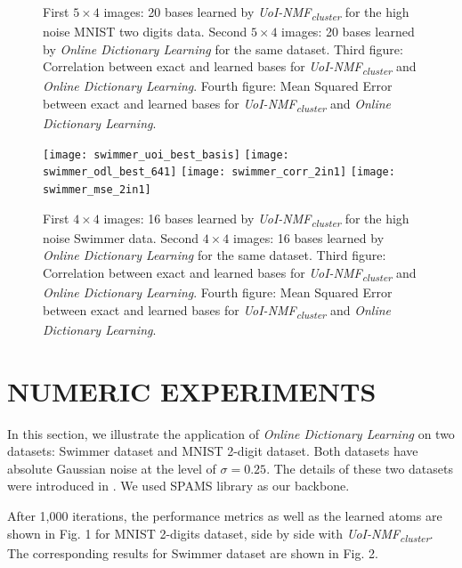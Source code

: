 \documentclass[conference]{IEEEtran}
\begin{document}
\begin{figure}[!htb]
\endminipage
\caption{First $5\times 4$ images: 20 bases learned by \textit{UoI-NMF\textsubscript{cluster}} for the high noise MNIST two digits data. Second $5\times 4$ images: 20 bases learned by \textit{Online Dictionary Learning} for the same dataset. Third figure: Correlation between exact and learned bases for \textit{UoI-NMF\textsubscript{cluster}} and \textit{Online Dictionary Learning}. Fourth figure: Mean Squared Error between exact and learned bases for \textit{UoI-NMF\textsubscript{cluster}} and \textit{Online Dictionary Learning}. }\label{fig:mnist_4}
\end{figure}

\begin{figure}[!htb]
\centering
{}
  \texttt{[image: swimmer\_uoi\_best\_basis]}
\endminipage\hfill
{}
  \texttt{[image: swimmer\_odl\_best\_641]}
\endminipage\hfill
{}%
  \texttt{[image: swimmer\_corr\_2in1]}
\endminipage
{}%
  \texttt{[image: swimmer\_mse\_2in1]}
\endminipage
\caption{First $4\times 4$ images: 16 bases learned by \textit{UoI-NMF\textsubscript{cluster}} for the
high noise Swimmer data. Second $4\times 4$ images: 16 bases learned by \textit{Online Dictionary Learning} for the same dataset. Third figure: Correlation between exact and learned bases for \textit{UoI-NMF\textsubscript{cluster}} and \textit{Online Dictionary Learning}. Fourth figure: Mean Squared Error between exact and learned bases for \textit{UoI-NMF\textsubscript{cluster}} and \textit{Online Dictionary Learning}. }\label{fig:swimmer_4}
\end{figure}


\section{NUMERIC EXPERIMENTS}
In this section, we illustrate the application of \textit{Online Dictionary Learning} on two datasets: Swimmer dataset and MNIST 2-digit dataset. Both datasets have absolute Gaussian noise at the level of $\sigma=0.25$. The details of these two datasets were introduced in \cite{b5}. We used SPAMS library \cite{b10,b11} as our backbone. 

After 1,000 iterations, the performance metrics as well as the learned atoms are shown in Fig. 1 for MNIST 2-digits dataset, side by side with \textit{UoI-NMF\textsubscript{cluster}}. The corresponding results for Swimmer dataset are shown in Fig. 2.
\end{document}

